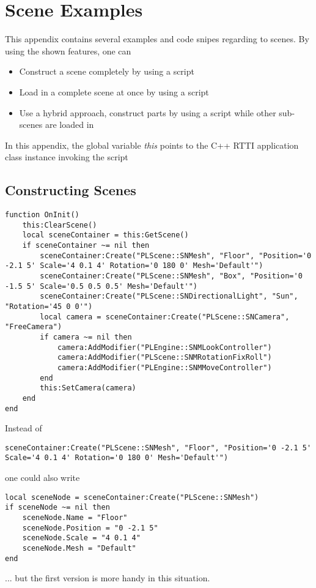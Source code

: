 \chapter{Scene Examples}
This appendix contains several examples and code snipes regarding to scenes. By using the shown features, one can
\begin{itemize}
\item{Construct a scene completely by using a script}
\item{Load in a complete scene at once by using a script}
\item{Use a hybrid approach, construct parts by using a script while other sub-scenes are loaded in}
\end{itemize}
In this appendix, the global variable \emph{this} points to the C++ \ac{RTTI} application class instance invoking the script 




\section{Constructing Scenes}
\begin{lstlisting}
function OnInit()
	this:ClearScene()
	local sceneContainer = this:GetScene()
	if sceneContainer ~= nil then
		sceneContainer:Create("PLScene::SNMesh", "Floor", "Position='0 -2.1 5' Scale='4 0.1 4' Rotation='0 180 0' Mesh='Default'")
		sceneContainer:Create("PLScene::SNMesh", "Box", "Position='0 -1.5 5' Scale='0.5 0.5 0.5' Mesh='Default'")
		sceneContainer:Create("PLScene::SNDirectionalLight", "Sun", "Rotation='45 0 0'")
		local camera = sceneContainer:Create("PLScene::SNCamera", "FreeCamera")
		if camera ~= nil then
			camera:AddModifier("PLEngine::SNMLookController")
			camera:AddModifier("PLScene::SNMRotationFixRoll")
			camera:AddModifier("PLEngine::SNMMoveController")
		end
		this:SetCamera(camera)
	end
end
\end{lstlisting}

Instead of
\begin{lstlisting}
sceneContainer:Create("PLScene::SNMesh", "Floor", "Position='0 -2.1 5' Scale='4 0.1 4' Rotation='0 180 0' Mesh='Default'")
\end{lstlisting}
one could also write
\begin{lstlisting}
local sceneNode = sceneContainer:Create("PLScene::SNMesh")
if sceneNode ~= nil then
	sceneNode.Name = "Floor"
	sceneNode.Position = "0 -2.1 5"
	sceneNode.Scale = "4 0.1 4"
	sceneNode.Mesh = "Default"
end
\end{lstlisting}
... but the first version is more handy in this situation.

